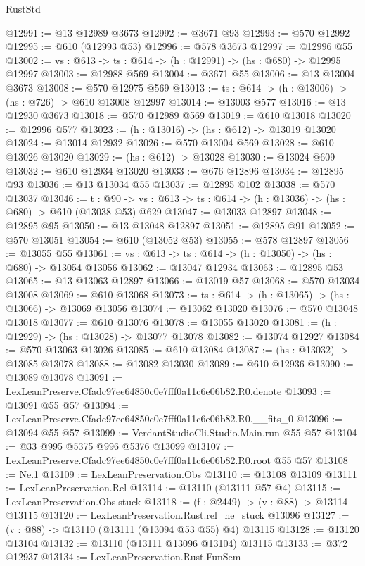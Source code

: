 \begin{lexlean}{RustStd}
\begin{coremodule}
@12991 := @13 @12989 @3673
@12992 := @3671 @93
@12993 := @570 @12992
@12995 := @610 (@12993 @53)
@12996 := @578 @3673
@12997 := @12996 @55
@13002 := {vs : @613} -> {ts : @614} -> (h : @12991) -> (hs : @680) -> @12995 @12997
@13003 := @12988 @569
@13004 := @3671 @55
@13006 := @13 @13004 @3673
@13008 := @570 @12975 @569
@13013 := {ts : @614} -> (h : @13006) -> (hs : @726) -> @610 @13008 @12997
@13014 := @13003 @577
@13016 := @13 @12930 @3673
@13018 := @570 @12989 @569
@13019 := @610 @13018
@13020 := @12996 @577
@13023 := (h : @13016) -> (hs : @612) -> @13019 @13020
@13024 := @13014 @12932
@13026 := @570 @13004 @569
@13028 := @610 @13026 @13020
@13029 := (hs : @612) -> @13028
@13030 := @13024 @609
@13032 := @610 @12934 @13020
@13033 := @676 @12896
@13034 := @12895 @93
@13036 := @13 @13034 @55
@13037 := @12895 @102
@13038 := @570 @13037
@13046 := {t : @90} ->
  {vs : @613} -> {ts : @614} -> (h : @13036) -> (hs : @680) -> @610 (@13038 @53) @629
@13047 := @13033 @12897
@13048 := @12895 @95
@13050 := @13 @13048 @12897
@13051 := @12895 @91
@13052 := @570 @13051
@13054 := @610 (@13052 @53)
@13055 := @578 @12897
@13056 := @13055 @55
@13061 := {vs : @613} -> {ts : @614} -> (h : @13050) -> (hs : @680) -> @13054 @13056
@13062 := @13047 @12934
@13063 := @12895 @53
@13065 := @13 @13063 @12897
@13066 := @13019 @57
@13068 := @570 @13034 @13008
@13069 := @610 @13068
@13073 := {ts : @614} -> (h : @13065) -> (hs : @13066) -> @13069 @13056
@13074 := @13062 @13020
@13076 := @570 @13048 @13018
@13077 := @610 @13076
@13078 := @13055 @13020
@13081 := (h : @12929) -> (hs : @13028) -> @13077 @13078
@13082 := @13074 @12927
@13084 := @570 @13063 @13026
@13085 := @610 @13084
@13087 := (hs : @13032) -> @13085 @13078
@13088 := @13082 @13030
@13089 := @610 @12936
@13090 := @13089 @13078
@13091 := LexLeanPreserve.Cfadc97ee64850c0e7fff0a11c6e06b82.R0.denote
@13093 := @13091 @55 @57
@13094 := LexLeanPreserve.Cfadc97ee64850c0e7fff0a11c6e06b82.R0.__fits_0
@13096 := @13094 @55 @57
@13099 := VerdantStudioCli.Studio.Main.run @55 @57
@13104 := @33 @995 @5375 @996 @5376 @13099
@13107 := LexLeanPreserve.Cfadc97ee64850c0e7fff0a11c6e06b82.R0.root @55 @57
@13108 := Ne.{1}
@13109 := LexLeanPreservation.Obs
@13110 := @13108 @13109
@13111 := LexLeanPreservation.Rel
@13114 := @13110 (@13111 @57 @4)
@13115 := LexLeanPreservation.Obs.stuck
@13118 := (f : @2449) -> (v : @88) -> @13114 @13115
@13120 := LexLeanPreservation.Rust.rel_ne_stuck @13096
@13127 := (v : @88) -> @13110 (@13111 (@13094 @53 @55) @4) @13115
@13128 := @13120 @13104
@13132 := @13110 (@13111 @13096 @13104) @13115
@13133 := @372 @12937
@13134 := LexLeanPreservation.Rust.FunSem

\end{coremodule}
\end{lexlean}
